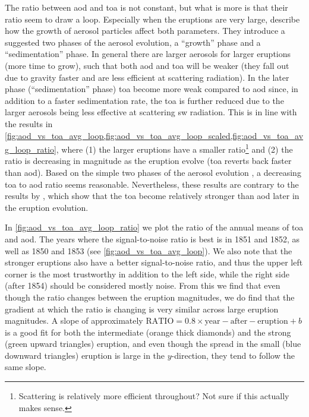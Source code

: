 \documentclass[twocol]{ametsocV5}
\begin{document}
The ratio between \acrshort{aod} and \acrshort{toa} is not constant, but what is more is
that their ratio seem to draw a loop. Especially when the eruptions are very large,
\citet[][see their sections 3.1.2, 3.2.2]{marshall2019} describe how the growth of
aerosol particles affect both parameters. They introduce a suggested two phases of the
aerosol evolution, a ``growth'' phase and a ``sedimentation'' phase. In general there
are larger aerosols for larger eruptions (more time to grow), such that both
\acrshort{aod} and \acrshort{toa} will be weaker (they fall out due to gravity faster
and are less efficient at scattering radiation). In the later phase (``sedimentation''
phase) \acrshort{toa} become more weak compared to \acrshort{aod} since, in addition to
a faster sedimentation rate, the \acrshort{toa} is further reduced due to the larger
aerosols being less effective at scattering \acrshort{sw} radiation. This is in line
with the results in
\cref{fig:aod_vs_toa_avg_loop,fig:aod_vs_toa_avg_loop_scaled,fig:aod_vs_toa_avg_loop_ratio},
where (1) the larger eruptions have a smaller ratio\footnote{Scattering is relatively
  more efficient throughout? Not sure if this actually makes sense.} and (2) the ratio is
decreasing in magnitude as the eruption evolve (\acrshort{toa} reverts back faster than
\acrshort{aod}). Based on the simple two phases of the aerosol evolution
\citep{marshall2019}, a decreasing \acrshort{toa} to \acrshort{aod} ratio seems
reasonable. Nevertheless, these results are contrary to the results by \citet[][their
  figure 1c,d]{marshall2020}, which show that the \acrshort{toa} become relatively
stronger than \acrshort{aod} later in the eruption evolution.

In \cref{fig:aod_vs_toa_avg_loop_ratio} we plot the ratio of the annual means of
\acrshort{toa} and \acrshort{aod}. The years where the signal-to-noise ratio is best is
in 1851 and 1852, as well as 1850 and 1853 (see \cref{fig:aod_vs_toa_avg_loop}). We also
note that the stronger eruptions also have a better signal-to-noise ratio, and thus the
upper left corner is the most trustworthy in addition to the left side, while the right
side (after 1854) should be considered mostly noise. From this we find that even though
the ratio changes between the eruption magnitudes, we do find that the gradient at which
the ratio is changing is very similar across large eruption magnitudes. A slope of
approximately \( \mathrm{RATIO}=0.8\times \mathrm{year-after-eruption} + b \) is a good
fit for both the intermediate (orange thick diamonds) and the strong (green upward
triangles) eruption, and even though the spread in the small (blue downward triangles)
eruption is large in the \( y \)-direction, they tend to follow the same slope.
\end{document}
